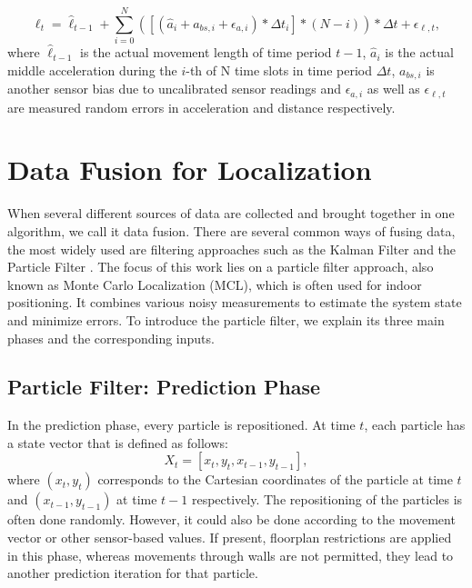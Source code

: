 \begin{equation}
\ell_{t} = \hat{\ell}_{t-1} + \sum_{i=0}^{N}([(\hat{a}_{i} + a_{bs,i} +\epsilon_{a, i}) * \Delta t_{i} ]*(N-i)) *\Delta t + \epsilon_{\ell, t},
\label{eqn:stride_length}
\end{equation}
where $\hat{\ell}_{t-1}$ is the actual movement length of time period $t-1$, $\hat{a}_{i}$ is the actual middle acceleration during the $i$-th of N time slots in time period $\Delta t$, $a_{bs,i}$ is another sensor bias due to uncalibrated sensor readings and $\epsilon_{a, i}$ as well as $\epsilon_{\ell, t}$ are measured random errors in acceleration and distance respectively.



\section{Data Fusion for Localization}
When several different sources of data are collected and brought together in one algorithm, we call it data fusion. There are several common ways of fusing data, the most widely used are filtering approaches such as the Kalman Filter \cite{Kurt} and the Particle Filter \cite{Carrera}. The focus of this work lies on a particle filter approach, also known as Monte Carlo Localization (MCL), which is often used for indoor positioning. It combines various noisy measurements to estimate the system state and minimize errors. To introduce the particle filter, we explain its three main phases and the corresponding inputs. 

\subsection{Particle Filter: Prediction Phase}
In the prediction phase, every particle is repositioned. At time $t$, each particle has a state vector that is defined as follows:
\begin{equation}
X_{t} = [x_{t}, y_{t}, x_{t-1}, y_{t-1}],
\label{eqn:particles}
\end{equation}
where $(x_{t}, y_{t})$ corresponds to the Cartesian coordinates of the particle at time $t$ and $(x_{t-1}, y_{t-1})$ at time $t-1$ respectively. The repositioning of the particles is often done randomly. However, it could also be done according to the movement vector or other sensor-based values. If present, floorplan restrictions are applied in this phase, whereas movements through walls are not permitted, they lead to another prediction iteration for that particle.

